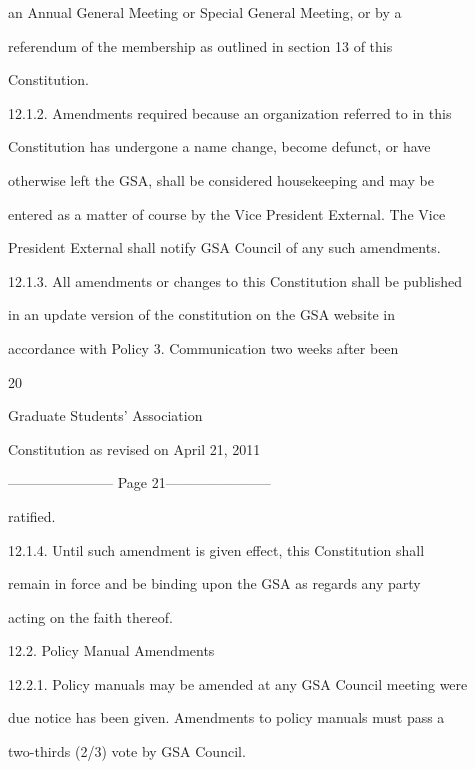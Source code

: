 \documentclass{article}
\begin{document}
an  Annual  General  Meeting  or  Special  General  Meeting,  or  by  a  

referendum  of  the  membership  as  outlined  in  section  13  of  this  

Constitution.  



12.1.2.     Amendments  required  because  an  organization  referred  to  in  this  

Constitution has undergone a name change, become defunct, or have  

otherwise left the GSA, shall be considered housekeeping and may be  

entered as a matter of course by the Vice President External. The Vice  

President External shall notify GSA Council of any such amendments.  



12.1.3.     All amendments or changes to this Constitution shall be published  

in  an  update  version  of  the  constitution  on  the  GSA  website  in  

accordance  with  Policy  3.  Communication  two  weeks  after  been  



     20  



       Graduate Students’ Association  



  Constitution as revised on April 21, 2011  


----------------------- Page 21-----------------------

ratified.  



12.1.4.     Until  such  amendment  is  given  effect,  this  Constitution  shall  

remain  in  force  and  be  binding  upon  the  GSA  as  regards  any  party  

acting on the faith thereof.  



12.2.       Policy Manual Amendments  



12.2.1.     Policy manuals may be amended at any GSA Council meeting were  

due notice has been given. Amendments to policy manuals must pass a  

two-thirds (2/3) vote by GSA Council.  
\end{document}
